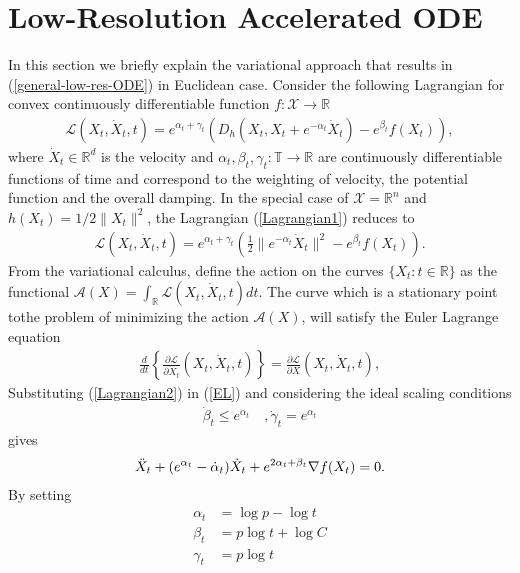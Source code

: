 \documentclass{article}
\theoremstyle{plain}
\theoremstyle{definition}
\theoremstyle{remark}
\begin{document}
\section{Low-Resolution Accelerated ODE}\label{sec_LR_ODE}
In this section we briefly explain the variational approach that results in (\ref{general-low-res-ODE}) in Euclidean case. Consider the following Lagrangian for convex continuously differentiable function $f : \mathcal{X}\rightarrow \mathbb{R}$ 
\begin{align}\label{Lagrangian1}
    \mathcal{L}(X_t,\dot{X}_t,t) =e^{\alpha_t+\gamma_t}(D_h(X_t,X_t+e^{-\alpha_t}\dot{X}_t)-e^{\beta_t}f(X_t)), 
\end{align}
where $\dot{X}_t\in \mathbb{R}^d$ is the velocity and $\alpha_t,\beta_t,\gamma_t:\mathbb{T}\rightarrow \mathbb{R}$ are continuously differentiable functions of time and correspond to the weighting of velocity, the potential function and the overall damping. In the special case of $\mathcal{X}=\mathbb R^n$ and $h(X_t)=1/2\|X_t\|^2$, the Lagrangian (\ref{Lagrangian1}) reduces to 
\begin{align}\label{Lagrangian2}
    \mathcal{L}(X_t,\dot{X}_t,t) =e^{\alpha_t+\gamma_t}(\frac{1}{2}\|e^{-\alpha_t}\dot{X}_t\|^2-e^{\beta_t}f(X_t)). 
\end{align}
 From the variational calculus, define the action on the curves $\{X_t:t\in \mathbb R\}$ as the functional $\mathcal{A}(X)=\int_{\mathbb R}\mathcal{L}(X_t,\dot X_t,t)dt $. The curve which is a stationary point tothe problem of minimizing the action $\mathcal{A}(X)$, will satisfy the Euler Lagrange equation
\begin{align}\label{EL}
    \frac{d}{dt}\left\{  \frac{\partial \mathcal{L}}{\partial \dot{X}_t}(X_t,\dot{X}_t,t)  \right\}=\frac{\partial \mathcal{L}}{\partial X}(X_t,\dot{X}_t,t),
\end{align}
Substituting (\ref{Lagrangian2}) in (\ref{EL}) and considering the ideal scaling conditions 
\begin{align}\label{ideal_scaling_conditions}
    \dot{\beta}_t\leq e^{\alpha_t} \quad, \dot{\gamma}_t = e^{\alpha_t}
\end{align}
 gives
\begin{align}\label{LRgeneral_form}
    \Ddot{X}_t+(e^{\alpha_t}-\dot{\alpha}_t)\dot{X}_t+e^{2\alpha_t+\beta_t}\nabla f(X_t)=0.
\end{align}
By setting 
\begin{align}
    \alpha_t &= \log p - \log t\nonumber\\
    \beta_t &= p\log t +\log C\nonumber\\
    \gamma_t &= p\log t\nonumber
\end{align}
\end{document}
